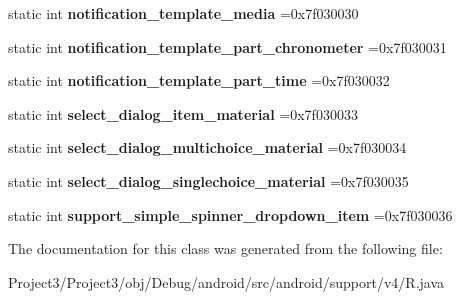 \begin{DoxyCompactItemize}
static int {\bfseries notification\+\_\+template\+\_\+media} =0x7f030030
\item 
\mbox{\label{classandroid_1_1support_1_1v4_1_1R_1_1layout_aa3e5e46cd44c02ba618a526889db4ab6}} 
static int {\bfseries notification\+\_\+template\+\_\+part\+\_\+chronometer} =0x7f030031
\item 
\mbox{\label{classandroid_1_1support_1_1v4_1_1R_1_1layout_a3f53bd804f2f3aafe59b1b088c5bf42f}} 
static int {\bfseries notification\+\_\+template\+\_\+part\+\_\+time} =0x7f030032
\item 
\mbox{\label{classandroid_1_1support_1_1v4_1_1R_1_1layout_a29540a3b09de6b0011c9d8429427a3fd}} 
static int {\bfseries select\+\_\+dialog\+\_\+item\+\_\+material} =0x7f030033
\item 
\mbox{\label{classandroid_1_1support_1_1v4_1_1R_1_1layout_ae68a438bf159ebf268d492e41db0b603}} 
static int {\bfseries select\+\_\+dialog\+\_\+multichoice\+\_\+material} =0x7f030034
\item 
\mbox{\label{classandroid_1_1support_1_1v4_1_1R_1_1layout_ae3cfef9df2b44a8017b13dd7f194baa6}} 
static int {\bfseries select\+\_\+dialog\+\_\+singlechoice\+\_\+material} =0x7f030035
\item 
\mbox{\label{classandroid_1_1support_1_1v4_1_1R_1_1layout_a546a683b54e0312f04a0c169e2404dfc}} 
static int {\bfseries support\+\_\+simple\+\_\+spinner\+\_\+dropdown\+\_\+item} =0x7f030036
\end{DoxyCompactItemize}


The documentation for this class was generated from the following file\+:\begin{DoxyCompactItemize}
\item 
Project3/\+Project3/obj/\+Debug/android/src/android/support/v4/R.\+java\end{DoxyCompactItemize}
